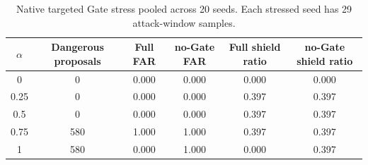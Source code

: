 \begin{table}[t]
\centering
\caption{Native targeted Gate stress pooled across 20 seeds. Each stressed seed has 29 attack-window samples.}
\label{tab:e2-gate}
\scriptsize
\setlength{\tabcolsep}{5pt}
\begin{tabular}{@{}cccccc@{}}
\toprule
$\alpha$ & Dangerous proposals & Full FAR & no-Gate FAR & Full shield ratio & no-Gate shield ratio\\
\midrule
0 & 0 & 0.000 & 0.000 & 0.000 & 0.000\\
0.25 & 0 & 0.000 & 0.000 & 0.397 & 0.397\\
0.5 & 0 & 0.000 & 0.000 & 0.397 & 0.397\\
0.75 & 580 & 1.000 & 1.000 & 0.397 & 0.397\\
1 & 580 & 0.000 & 1.000 & 0.000 & 0.397\\
\bottomrule
\end{tabular}
\end{table}
